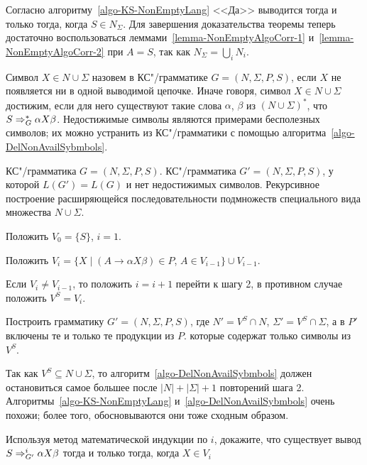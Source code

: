 \begin{myproof}
Согласно алгоритму~\ref{algo-KS-NonEmptyLang} <<Да>> выводится тогда и только тогда, когда $S\in N_\Sigma$. Для завершения доказательства теоремы теперь достаточно воспользоваться леммами~\ref{lemma-NonEmptyAlgoCorr-1} и~\ref{lemma-NonEmptyAlgoCorr-2} при $A=S$, так как $N_\Sigma=\bigcup_iN_i$.
\end{myproof}

Символ $X\in N\cup\Sigma$ назовем  в КС"/грамматике $G=(N,\Sigma,P,S)$, если $X$ не появляется ни в одной выводимой цепочке. Иначе говоря, символ $X\in N\cup\Sigma$ достижим, если для него существуют такие слова $\alpha$, $\beta$ из $(N\cup\Sigma)^*$, что $S\Rightarrow_G^*\alpha X\beta$. Недостижимые символы являются примерами бесполезных символов; их можно устранить из КС"/грамматики с помощью алгоритма~\ref{algo-DelNonAvailSybmbols}.

{\label{algo-DelNonAvailSybmbols}КС"/грамматика $G=(N,\Sigma,P,S)$.}
{КС"/грамматика $G'=(N,\Sigma,P,S)$, у которой $L(G')=L(G)$ и нет недостижимых символов.}
{Рекурсивное построение расширяющейся последовательности подмножеств специального вида множества $N\cup\Sigma$.}
{
\item Положить $V_0=\{S\}$, $i=1$.

\item  Положить $V_i=\{X\mid (A\to\alpha X\beta)\in P$, $A\in V_{i-1} \}\cup V_{i-1}$.

\item  Если $V_i\neq V_{i-1}$, то положить $i=i+1$ перейти к шагу 2, в противном случае положить $V^S=V_i$.

\item  Построить грамматику $G'=(N,\Sigma,P,S)$, где $N'=V^S\cap N$, $\Sigma '=V^S\cap\Sigma$, а в $P'$ включены те и только те продукции из $P$. которые содержат только символы из $V^S$.
}

Так как $V^S\subseteq N\cup\Sigma$, то алгоритм~\ref{algo-DelNonAvailSybmbols} должен остановиться самое большее после $|N| + |\Sigma|+1$ повторений шага 2. Алгоритмы~\ref{algo-KS-NonEmptyLang} и~\ref{algo-DelNonAvailSybmbols} очень похожи; более того, обосновываются они тоже сходным образом.

\begin{myproblem}
Используя метод математической индукции по $i$, докажите, что существует вывод $S\Rightarrow_{G'}^i\alpha X\beta$ тогда и только тогда, когда $X\in V_i$
\end{myproblem}

